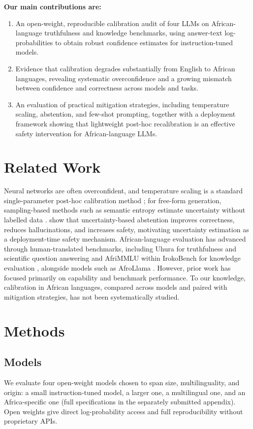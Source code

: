 \documentclass[pmlr]{jmlr}%
\begin{document}
\medskip
\noindent\textbf{Our main contributions are:}
\begin{enumerate}\itemsep1pt
  \item An open-weight, reproducible calibration audit of four LLMs on African-language truthfulness
  and knowledge benchmarks, using answer-text log-probabilities to obtain robust confidence estimates
  for instruction-tuned models.

  \item Evidence that calibration degrades substantially from English to African languages, revealing
  systematic overconfidence and a growing mismatch between confidence and correctness across models
  and tasks.

  \item An evaluation of practical mitigation strategies, including temperature scaling, abstention,
  and few-shot prompting, together with a deployment framework showing that lightweight post-hoc
  recalibration is an effective safety intervention for African-language LLMs.
\end{enumerate}

\section{Related Work}
Neural networks are often overconfident, and temperature scaling is a standard single-parameter
post-hoc calibration method \citep{guo2017}; for free-form generation, sampling-based methods such as
semantic entropy estimate uncertainty without labelled data \citep{kuhn2023}. \citet{tomani2024}
show that uncertainty-based abstention improves correctness, reduces hallucinations, and increases
safety, motivating uncertainty estimation as a deployment-time safety mechanism. African-language
evaluation has advanced through human-translated benchmarks, including Uhura for truthfulness and
scientific question answering \citep{uhura} and AfriMMLU within IrokoBench for knowledge evaluation
\citep{irokobench}, alongside models such as AfroLlama \citep{afrollama}. However, prior work has
focused primarily on capability and benchmark performance. To our knowledge, calibration in African
languages, compared across models and paired with mitigation strategies, has not been systematically
studied.

\section{Methods}

\subsection{Models}
We evaluate four open-weight models chosen to span size, multilinguality, and origin: a small
instruction-tuned model, a larger one, a multilingual one, and an Africa-specific one (full
specifications in the separately submitted appendix). Open weights give direct log-probability access
and full reproducibility without proprietary APIs.
\end{document}
